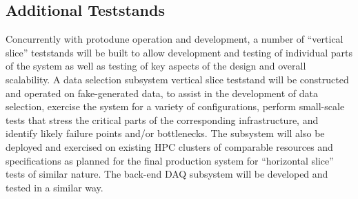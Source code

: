



\subsection{Additional Teststands}
\label{sec:sp-daq:validation-demonstrators}

Concurrently with protodune operation and development, a number of
``vertical slice'' teststands will be built to allow 
development and testing of individual parts of the  system
as well as testing of key aspects of the design and overall
scalability. A data selection subsystem vertical slice teststand will be
constructed and operated on fake-generated data, to assist in the
development of data selection, exercise the system for a variety of
configurations, perform small-scale tests that stress the critical
parts of the corresponding infrastructure, 
and identify likely failure points and/or bottlenecks. The subsystem
will also be deployed and exercised on existing HPC clusters of
comparable resources and specifications as planned for the final
production system for ``horizontal slice'' tests of similar nature. The
back-end DAQ subsystem will be developed and tested in a similar way.

